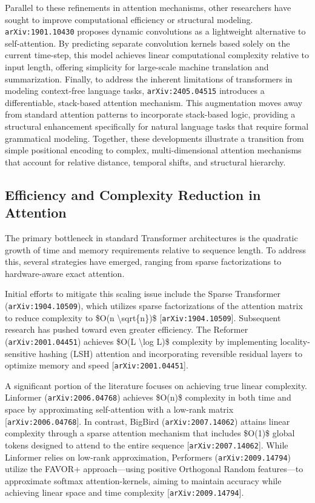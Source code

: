 \documentclass[11pt]{article}
\begin{document}
Parallel to these refinements in attention mechanisms, other researchers have sought to improve computational efficiency or structural modeling. \texttt{arXiv:1901.10430} proposes dynamic convolutions as a lightweight alternative to self-attention. By predicting separate convolution kernels based solely on the current time-step, this model achieves linear computational complexity relative to input length, offering simplicity for large-scale machine translation and summarization. Finally, to address the inherent limitations of transformers in modeling context-free language tasks, \texttt{arXiv:2405.04515} introduces a differentiable, stack-based attention mechanism. This augmentation moves away from standard attention patterns to incorporate stack-based logic, providing a structural enhancement specifically for natural language tasks that require formal grammatical modeling. Together, these developments illustrate a transition from simple positional encoding to complex, multi-dimensional attention mechanisms that account for relative distance, temporal shifts, and structural hierarchy.

\subsection{Efficiency and Complexity Reduction in Attention}

The primary bottleneck in standard Transformer architectures is the quadratic growth of time and memory requirements relative to sequence length. To address this, several strategies have emerged, ranging from sparse factorizations to hardware-aware exact attention.

Initial efforts to mitigate this scaling issue include the Sparse Transformer (\texttt{arXiv:1904.10509}), which utilizes sparse factorizations of the attention matrix to reduce complexity to \$O(n \textbackslash{}sqrt\{n\})\$ [\texttt{arXiv:1904.10509}]. Subsequent research has pushed toward even greater efficiency. The Reformer (\texttt{arXiv:2001.04451}) achieves \$O(L \textbackslash{}log L)\$ complexity by implementing locality-sensitive hashing (LSH) attention and incorporating reversible residual layers to optimize memory and speed [\texttt{arXiv:2001.04451}].

A significant portion of the literature focuses on achieving true linear complexity. Linformer (\texttt{arXiv:2006.04768}) achieves \$O(n)\$ complexity in both time and space by approximating self-attention with a low-rank matrix [\texttt{arXiv:2006.04768}]. In contrast, BigBird (\texttt{arXiv:2007.14062}) attains linear complexity through a sparse attention mechanism that includes \$O(1)\$ global tokens designed to attend to the entire sequence [\texttt{arXiv:2007.14062}]. While Linformer relies on low-rank approximation, Performers (\texttt{arXiv:2009.14794}) utilize the FAVOR+ approach—using positive Orthogonal Random features—to approximate softmax attention-kernels, aiming to maintain accuracy while achieving linear space and time complexity [\texttt{arXiv:2009.14794}].
\end{document}
